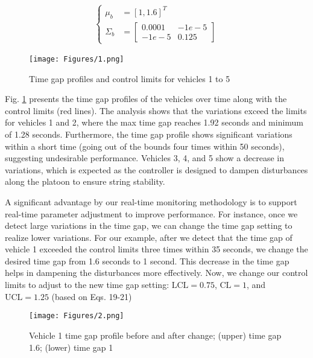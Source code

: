 \documentclass{article}
\begin{document}
\begin{align}
    \begin{cases}
    \mu_b &= [1, 1.6]^T\\
    \Sigma_b &= \begin{bmatrix} 0.0001 & -1e-5\\ -1e-5 & 0.125
    \end{bmatrix}
    \end{cases}
\end{align}


\begin{figure}[!htb]
    \centering
    \centerline{\texttt{[image: Figures/1.png]}}
    \caption{Time gap profiles and control limits for vehicles 1 to 5}
    \label{fig:1}
\end{figure}

Fig. \ref{fig:1} presents the time gap profiles of the vehicles over time along with the control limits (red lines). The analysis shows that the variations exceed the limits for vehicles 1 and 2, where the max time gap reaches 1.92 seconds and minimum of 1.28 seconds. Furthermore, the time gap profile shows significant variations within a short time (going out of the bounds four times within 50 seconds), suggesting undesirable performance. Vehicles 3, 4, and 5 show a decrease in variations, which is expected as the controller is designed to dampen disturbances along the platoon to ensure string stability. 

A significant advantage by our real-time monitoring methodology is to support real-time parameter adjustment to improve performance. For instance, once we detect large variations in the time gap, we can change the time gap setting to realize lower variations. For our example, after we detect that the time gap of vehicle 1 exceeded the control limits three times within 35 seconds, we change the desired time gap from 1.6 seconds to 1 second. This decrease in the time gap helps in dampening the disturbances more effectively. Now, we change our control limits to adjust to the new time gap setting: $\mbox{LCL} = 0.75$, $\mbox{CL} = 1$, and $\mbox{UCL} = 1.25$ (based on Eqs. 19-21)

\begin{figure}[!htb]
    \centering
    \centerline{\texttt{[image: Figures/2.png]}}
    \caption{Vehicle 1 time gap profile before and after change; (upper) time gap 1.6; (lower) time gap 1}
    \label{fig:2}
\end{figure}
\end{document}
